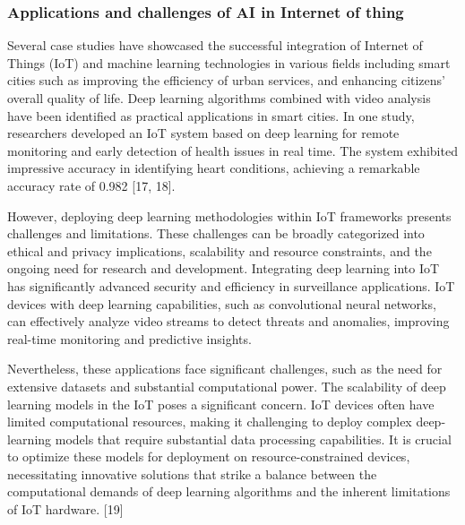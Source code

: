\subsubsection{Applications and challenges of AI in Internet of thing}
Several case studies have showcased the successful integration of Internet of Things (IoT) and machine learning technologies in various fields including smart cities such as improving the efficiency of urban services, and enhancing citizens' overall quality of life. 
Deep learning algorithms combined with video analysis have been identified as practical applications in smart cities. 
In one study, researchers developed an IoT system based on deep learning for remote monitoring and early detection of health issues in real time. 
The system exhibited impressive accuracy in identifying heart conditions, achieving a remarkable accuracy rate of 0.982 [17, 18].

However, deploying deep learning methodologies within IoT frameworks presents challenges and limitations. These challenges can be broadly categorized into ethical and privacy implications, scalability and resource constraints, and the ongoing need for research and development.
Integrating deep learning into IoT has significantly advanced security and efficiency in surveillance applications. IoT devices with deep learning capabilities, such as convolutional neural networks, can effectively analyze video streams to detect threats and anomalies, improving real-time monitoring and predictive insights.

Nevertheless, these applications face significant challenges, such as the need for extensive datasets and substantial computational power.
The scalability of deep learning models in the IoT poses a significant concern. IoT devices often have limited computational resources, making it challenging to deploy complex deep-learning models that require substantial data processing capabilities.
It is crucial to optimize these models for deployment on resource-constrained devices, necessitating innovative solutions that strike a balance between the computational demands of deep learning algorithms and the inherent limitations of IoT hardware. [19]
